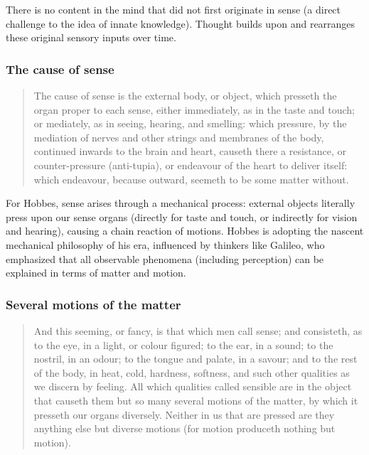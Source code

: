             \begin{remark}
                There is no content in the mind that did not first originate in sense (a direct challenge to the idea of innate knowledge). Thought builds upon and rearranges these original sensory inputs over time.
            \end{remark}

        \subsubsection{The cause of sense}

            \begin{quote}
                The cause of sense is the external body, or object, which presseth the organ proper to each sense, either immediately, as in the taste and touch; or mediately, as in seeing, hearing, and smelling: which pressure, by the mediation of nerves and other strings and membranes of the body, continued inwards to the brain and heart, causeth there a resistance, or counter-pressure (anti-tupia), or endeavour of the heart to deliver itself: which endeavour, because outward, seemeth to be some matter without.
            \end{quote}

            For Hobbes, sense arises through a mechanical process: external objects literally press upon our sense organs (directly for taste and touch, or indirectly for vision and hearing), causing a chain reaction of motions. Hobbes is adopting the nascent mechanical philosophy of his era, influenced by thinkers like Galileo, who emphasized that all observable phenomena (including perception) can be explained in terms of matter and motion.

\newpage
        \subsubsection{Several motions of the matter}

            \begin{quote}
                And this seeming, or fancy, is that which men call sense; and consisteth, as to the eye, in a light, or colour figured; to the ear, in a sound; to the nostril, in an odour; to the tongue and palate, in a savour; and to the rest of the body, in heat, cold, hardness, softness, and such other qualities as we discern by feeling. All which qualities called sensible are in the object that causeth them but so many several motions of the matter, by which it presseth our organs diversely. Neither in us that are pressed are they anything else but diverse motions (for motion produceth nothing but motion).
            \end{quote}

